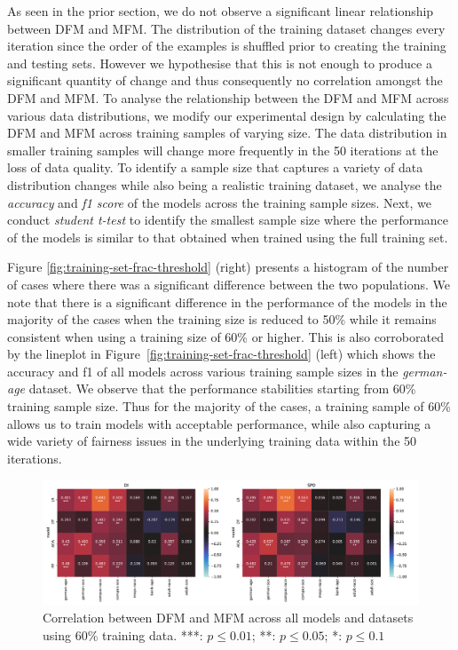 \documentclass{article}
\begin{document}
As seen in the prior section, we do not observe a significant linear
relationship between DFM and MFM. The distribution of the training
dataset changes every iteration since the order of the examples is
shuffled prior to creating the training and testing sets. However we
hypothesise that this is not enough to produce a significant quantity
of change and thus consequently no correlation amongst the DFM and
MFM. To analyse the relationship between the DFM and MFM across
various data distributions, we modify our experimental design by
calculating the DFM and MFM across training samples of varying
size. The data distribution in smaller training samples will change
more frequently in the 50 iterations at the loss of data quality. To
identify a sample size that captures a variety of data distribution
changes while also being a realistic training dataset, we analyse the
\emph{accuracy} and \emph{f1 score} of the models across the training
sample sizes. Next, we conduct \emph{student t-test} to identify the
smallest sample size where the performance of the models is similar to
that obtained when trained using the full training set.

Figure \ref{fig:training-set-frac-threshold} (right) presents
a histogram of the number of cases where there was a significant
difference between the two populations. We note that there is
a significant difference in the performance of the models in the
majority of the cases when the training size is reduced to 50\% while
it remains consistent when using a training size of 60\% or
higher. This is also corroborated by the lineplot in
Figure \ref{fig:training-set-frac-threshold} (left) which shows the
accuracy and f1 of all models across various training sample sizes in
the \emph{german-age} dataset. We observe that the performance
stabilities starting from 60\% training sample size. Thus for the
majority of the cases, a training sample of 60\% allows us to train
models with acceptable performance, while also capturing a wide
variety of fairness issues in the underlying training data within the
50 iterations.

\begin{figure}
  \centering
  \includegraphics[width=0.95\linewidth]{heatmap--corr--training-sets-frac.pdf}
  \caption{Correlation between DFM and MFM across all models and
  datasets using 60\% training data. ***: $p\le0.01$; **: $p\le0.05$;
  *: $p\le0.1$}
  \label{fig:heatmap--corr--training-sets-frac}
\end{figure}
\end{document}
